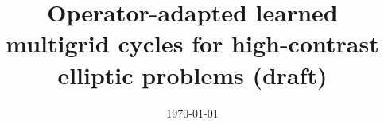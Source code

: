 \documentclass[11pt]{article}
\begin{document}
\title{Operator-adapted learned multigrid cycles for high-contrast elliptic problems (draft)}\author{}\date{\today}\maketitle
\begin{abstract}\end{abstract}



\clearpage


\end{document}

